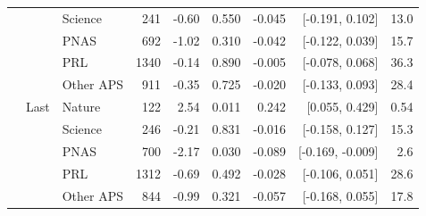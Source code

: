 \begin{tabular}{lllrrrrrr}
 &  & Science & 241 & -0.60 & 0.550 & -0.045 & [-0.191, 0.102] & 13.0 \\
 &  & PNAS & 692 & -1.02 & 0.310 & -0.042 & [-0.122, 0.039] & 15.7 \\
 &  & PRL & 1340 & -0.14 & 0.890 & -0.005 & [-0.078, 0.068] & 36.3 \\
 &  & Other APS & 911 & -0.35 & 0.725 & -0.020 & [-0.133, 0.093] & 28.4 \\
 & Last & Nature & 122 & 2.54 & 0.011 & 0.242 & [0.055, 0.429] & 0.54 \\
 &  & Science & 246 & -0.21 & 0.831 & -0.016 & [-0.158, 0.127] & 15.3 \\
 &  & PNAS & 700 & -2.17 & 0.030 & -0.089 & [-0.169, -0.009] & 2.6 \\
 &  & PRL & 1312 & -0.69 & 0.492 & -0.028 & [-0.106, 0.051] & 28.6 \\
 &  & Other APS & 844 & -0.99 & 0.321 & -0.057 & [-0.168, 0.055] & 17.8 \\
\bottomrule
\end{tabular}
